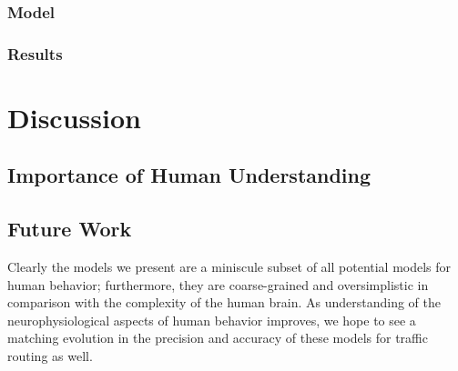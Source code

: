 \documentclass[acmlarge]{acmart}
\begin{document}
\subsubsection{Model}
\subsubsection{Results}


\section{Discussion}
\subsection{Importance of Human Understanding}
\subsection{Future Work}
Clearly the models we present are a miniscule subset of all potential models for human behavior; 
furthermore, they are coarse-grained and oversimplistic in comparison with the complexity of the human
brain. As understanding of the neurophysiological aspects of human behavior improves, we hope to see a matching evolution in the precision and accuracy of these models for traffic routing as well.



\end{document}
